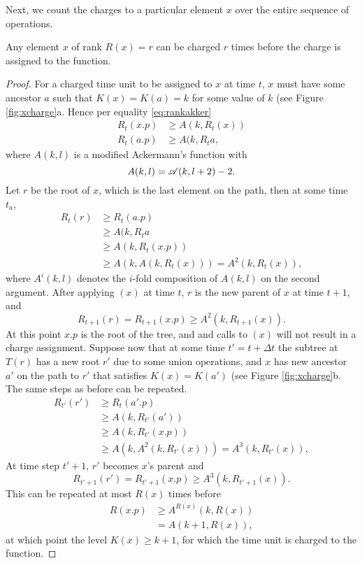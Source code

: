Next, we count the charges to a particular element $x$ over the entire sequence of operations. 
\begin{lemma}\label{lem:xcharge}
  Any element $x$ of rank $R(x) = r$ can be charged $r$ times before the charge is assigned to the  function.
\end{lemma}
\begin{proof}
  For a charged time unit to be assigned to $x$ at time $t$, $x$ must have some ancestor $a$ such that $K(x) = K(a) = k$ for some value of $k$ (see Figure \ref{fig:xcharge}a. Hence per equality \ref{eq:rankakker}
  \begin{align*}
    R_{t}(x.p) & \geq A(k,R_{t}(x))\\
    R_{t}(a.p) & \geq A(k,R_{t}a,
  \end{align*}
  where $A(k,l)$ is a modified Ackermann's function with 
  \begin{equation*}
    A(k,l) = \mathscr{A}(k,l+2)-2.
  \end{equation*}
  Let $r$ be the root of $x$, which is the last element on the path, then at some time $t_a$,
  \begin{align*}
    R_{t}(r) &\geq R_{t}(a.p) \\
    &\geq A(k,R_{t}a \\
    &\geq A(k,R_{t}(x.p)) \\
    &\geq A(k, A(k, R_{t}(x))) = A^2(k, R_{t}(x)),
  \end{align*}
  where $A^i(k,l)$ denotes the $i$-fold composition of $A(k,l)$ on the second argument. After applying $(x)$ at time $t$, $r$ is the new parent of $x$ at time $t+1$, and 
  \begin{equation*}
    R_{t+1}(r) = R_{t+1}(x.p) \geq A^2(k, R_{t+1}(x)).
  \end{equation*}
  At this point $x.p$ is the root of the tree, and and calls to $(x)$ will not result in a charge assignment. Suppose now that at some time $t' = t + \Delta t$ the subtree at $T(r)$ has a new root $r'$ due to some union operations, and $x$ has new ancestor $a'$ on the path to $r'$ that satisfies $K(x) = K(a')$ (see Figure \ref{fig:xcharge}b. The same steps as before can be repeated. 
  \begin{align*}
    R_{t'}(r') &\geq R_{t}(a'.p) \\
    &\geq A(k,R_{t'}(a')) \\
    &\geq A(k,R_{t'}(x.p)) \\
    &\geq A(k, A^2(k, R_{t'}(x))) = A^3(k, R_{t'}(x)),
  \end{align*}
  At time step $t'+1$, $r'$ becomes $x$'s parent and
  \begin{equation*}
    R_{t'+1}(r') = R_{t'+1}(x.p) \geq A^3(k, R_{t'+1}(x)).
  \end{equation*}
  This can be repeated at most $R(x)$ times before
  \begin{align*}
    R(x.p) &\geq A^{R(x)}(k,R(x)) \\
    &= A(k+1, R(x)),
  \end{align*}
  at which point the level $K(x)\geq k+1$, for which the time unit is charged to the  function. 
\end{proof}

